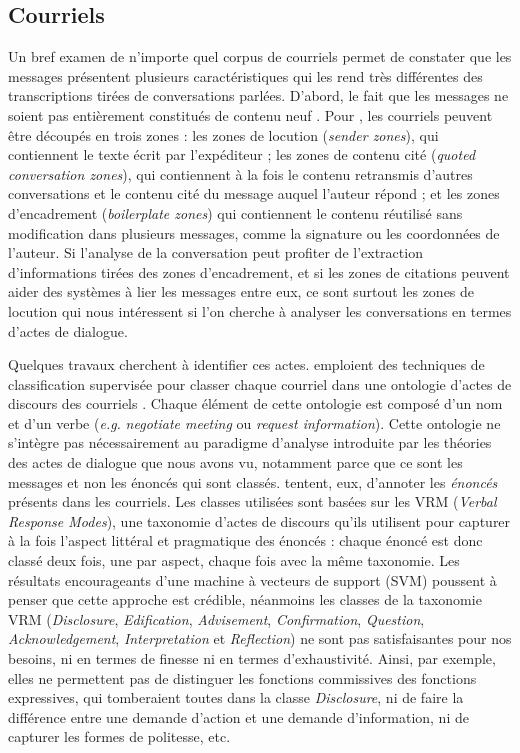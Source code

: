 \documentclass[10pt,a4paper,twoside]{article}
\begin{document}
\subsection{Courriels}
\label{subsec:emails}

Un bref examen de n'importe quel corpus de courriels permet de constater que les messages présentent plusieurs caractéristiques qui les rend très différentes des transcriptions tirées de conversations parlées. D'abord, le fait que les messages ne soient pas entièrement constitués de contenu \og neuf \fg. Pour \citet{lampert2009segmenting}, les courriels peuvent être découpés en trois zones : les zones de locution (\textit{sender zones}), qui contiennent le texte écrit par l'expéditeur ; les zones de contenu cité (\textit{quoted conversation zones}), qui contiennent à la fois le contenu retransmis d'autres conversations et le contenu cité du message auquel l'auteur répond ; et les zones d'encadrement (\textit{boilerplate zones}) qui contiennent le contenu réutilisé sans modification dans plusieurs messages, comme la signature ou les coordonnées de l'auteur. Si l'analyse de la conversation peut profiter de l'extraction d'informations tirées des zones d'encadrement, et si les zones de citations peuvent aider des systèmes à lier les messages entre eux, ce sont surtout les zones de locution qui nous intéressent si l'on cherche à analyser les conversations en termes d'actes de dialogue.

Quelques travaux cherchent à identifier ces actes. \citet{cohen2004learning} emploient des techniques de classification supervisée pour classer chaque courriel dans une ontologie d'\og actes de discours des courriels \fg. Chaque élément de cette ontologie est composé d'un nom et d'un verbe (\textit{e.g.} \textit{negotiate meeting} ou \textit{request information}). Cette ontologie ne s'intègre pas nécessairement au paradigme d'analyse introduite par les théories des actes de dialogue que nous avons vu, notamment parce que ce sont les messages et non les énoncés qui sont classés. \citet{lampert2006classifying} tentent, eux, d'annoter les \textit{énoncés} présents dans les courriels. Les classes utilisées sont basées sur les VRM (\textit{Verbal Response Modes}), une taxonomie d'actes de discours qu'ils utilisent pour capturer à la fois l'aspect littéral et pragmatique des énoncés : chaque énoncé est donc classé deux fois, une par aspect, chaque fois avec la même taxonomie. Les résultats encourageants d'une machine à vecteurs de support (SVM) poussent \citeauthor{lampert2006classifying} à penser que cette approche est crédible, néanmoins les classes de la taxonomie VRM (\textit{Disclosure}, \textit{Edification}, \textit{Advisement}, \textit{Confirmation}, \textit{Question}, \textit{Acknowledgement}, \textit{Interpretation} et \textit{Reflection}) ne sont pas satisfaisantes pour nos besoins, ni en termes de finesse ni en termes d'exhaustivité. Ainsi, par exemple, elles ne permettent pas de distinguer les fonctions commissives des fonctions expressives, qui tomberaient toutes dans la classe \textit{Disclosure}, ni de faire la différence entre une demande d'action et une demande d'information, ni de capturer les formes de politesse, etc.
\end{document}
